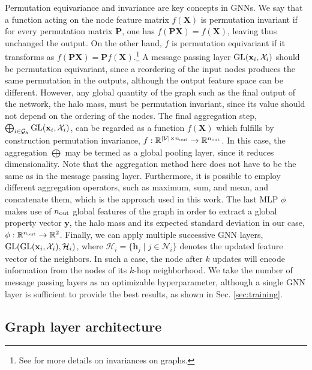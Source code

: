 \documentclass[twocolumn]{aastex631}
\begin{document}
Permutation equivariance and invariance are key concepts in GNNs. We say that a function acting on the node feature matrix $f(\textbf{X})$ is permutation invariant if for every permutation matrix $\textbf{P}$, one has $f(\textbf{P}\textbf{X})=f(\textbf{X})$, leaving thus unchanged the output. On the other hand, $f$ is permutation equivariant if it transforms as $f(\textbf{P}\textbf{X})=\textbf{P}f(\textbf{X})$.\footnote{See \cite{2021arXiv210413478B} for more details on invariances on graphs.} A message passing layer ${\rm GL}(\textbf{x}_i, \mathcal{X}_i)$ should be permutation equivariant, since a reordering of the input nodes produces the same permutation in the outputs, although the output feature space can be different. However, any global quantity of the graph such as the final output of the network, the halo mass, must be permutation invariant, since its value should not depend on the ordering of the nodes. The final aggregation step, $\bigoplus_{i \in \mathcal{G}_h} {\rm GL}(\textbf{x}_i, \mathcal{X}_i)$, can be regarded as a function $f(\textbf{X})$ which fulfills by construction permutation invariance, $f: \mathbb{R}^{|\mathcal{V}|\times n_{\rm out}} \rightarrow \mathbb{R}^{n_{\rm out}}$. In this case, the aggregation $\bigoplus$ may be termed as a global pooling layer, since it reduces dimensionality. Note that the aggregation method here does not have to be the same as in the message passing layer. Furthermore, it is possible to employ different aggregation operators, such as maximum, sum, and mean, and concatenate them, which is the approach used in this work. The last MLP $\phi$ makes use of $n_{\rm out}$ global features of the graph in order to extract a global property vector $\textbf{y}$, the halo mass and its expected standard deviation in our case, $\phi: \mathbb{R}^{n_{\rm out}} \rightarrow \mathbb{R}^2$. Finally, we can apply multiple successive GNN layers, ${\rm GL}({\rm GL}(\textbf{x}_i, \mathcal{X}_i), \mathcal{H}_i)$, where $\mathcal{H}_i = \{\textbf{h}_j \; | \; j \in\mathcal{N}_i \}$ denotes the updated feature vector of the neighbors. In such a case, the node after $k$ updates will encode information from the nodes of its $k$-hop neighborhood. We take the number of message passing layers as an optimizable hyperparameter, although a single GNN layer is sufficient to provide the best results, as shown in Sec. \ref{sec:training}.



\subsection{Graph layer architecture}
\label{sec:architecture}
\end{document}
